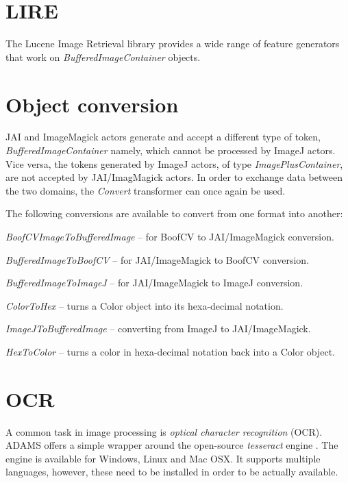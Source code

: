 \documentclass[a4paper]{book}
\begin{document}
\chapter{LIRE}
The Lucene Image Retrieval library \cite{lire} provides a wide range of feature
generators that work on \textit{BufferedImageContainer} objects.


\chapter{Object conversion}
JAI and ImageMagick actors generate and accept a different type of token,
\textit{BufferedImageContainer} namely, which cannot be processed by ImageJ
actors. Vice versa, the tokens generated by ImageJ actors, of type
\textit{ImagePlusContainer}, are not accepted by JAI/ImagMagick actors. In order
to exchange data between the two domains, the \textit{Convert} transformer can
once again be used. 

The following conversions are available to convert from one
format into another:
\begin{tight_itemize}
	\item \textit{BoofCVImageToBufferedImage} -- for BoofCV to JAI/ImageMagick
	conversion.
	\item \textit{BufferedImageToBoofCV} -- for JAI/ImageMagick to BoofCV
	conversion.
	\item \textit{BufferedImageToImageJ} -- for JAI/ImageMagick to ImageJ
	conversion.
	\item \textit{ColorToHex} -- turns a Color object into its hexa-decimal 
	notation.
	\item \textit{ImageJToBufferedImage} -- converting from ImageJ to
	JAI/ImageMagick.
	\item \textit{HexToColor} -- turns a color in hexa-decimal notation back 
	into a Color object.
\end{tight_itemize}


\chapter{OCR}
A common task in image processing is \textit{optical character recognition} 
(OCR). ADAMS offers a simple wrapper around the open-source \textit{tesseract} 
engine \cite{tesseract}. The engine is available for Windows, Linux and Mac OSX.
It supports multiple languages, however, these need to be installed in order to
be actually available.
\end{document}
